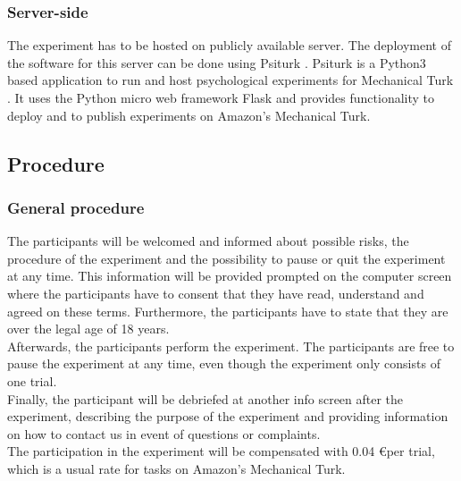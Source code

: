 \documentclass[a4paper, doc, draftall]{apa6}
\begin{document}
	\subsubsection{Server-side}
	The experiment has to be hosted on publicly available server. The deployment of the software for this server can be done using Psiturk \parencite{mcdonnell2012psiturk}. Psiturk is a Python3 based application to run and host psychological experiments for Mechanical Turk \parencite{Gureckis2016}. It uses the Python micro web framework Flask \parencite{ronacher2010flask} and provides functionality to deploy and to publish experiments on Amazon's Mechanical Turk.
		
	\subsection{Procedure}	
		\subsubsection{General procedure}
			The participants will be welcomed and informed about possible risks, the procedure of the experiment and the possibility to pause or quit the experiment at any time. This information will be provided prompted on the computer screen where the participants have to consent that they have read, understand and agreed on these terms. Furthermore, the participants have to state that they are over the legal age of 18 years.\\
			Afterwards, the participants perform the experiment. The participants are free to pause the experiment at any time, even though the experiment only consists of one trial.\\
			Finally, the participant will be debriefed at another info screen after the experiment, describing the purpose of the experiment and providing information on how to contact us in event of questions or complaints.\\
			The participation in the experiment will be compensated with 0.04 \euro per trial, which is a usual rate for tasks on Amazon's Mechanical Turk.
		
\end{document}
